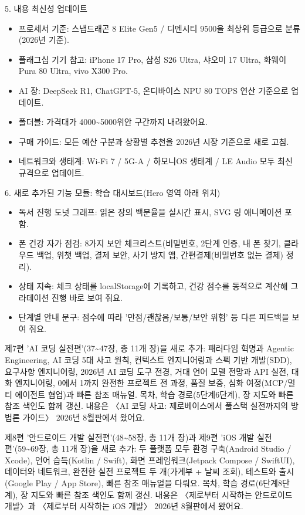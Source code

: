 5. 내용 최신성 업데이트

\begin{itemize}
  \item 프로세서 기준: 스냅드래곤 8 Elite Gen5 / 디멘시티 9500을 최상위 등급으로 분류(2026년 기준).
  \item 플래그십 기기 참고: iPhone 17 Pro, 삼성 S26 Ultra, 샤오미 17 Ultra, 화웨이 Pura 80 Ultra, vivo X300 Pro.
  \item AI 장: DeepSeek R1, ChatGPT-5, 온디바이스 NPU 80 TOPS 연산 기준으로 업데이트.
  \item 폴더블: 가격대가 4000\textasciitilde{}5000위안 구간까지 내려왔어요.
  \item 구매 가이드: 모든 예산 구분과 상황별 추천을 2026년 시장 기준으로 새로 고침.
  \item 네트워크와 생태계: Wi-Fi 7 / 5G-A / 하모니OS 생태계 / LE Audio 모두 최신 규격으로 업데이트.
\end{itemize}

6. 새로 추가된 기능 모듈: 학습 대시보드(Hero 영역 아래 위치)

\begin{itemize}
  \item 독서 진행 도넛 그래프: 읽은 장의 백분율을 실시간 표시, SVG 링 애니메이션 포함.
  \item 폰 건강 자가 점검: 8가지 보안 체크리스트(비밀번호, 2단계 인증, 내 폰 찾기, 클라우드 백업, 위챗 백업, 결제 보안, 사기 방지 앱, 간편결제(비밀번호 없는 결제) 정리).
  \item 상태 지속: 체크 상태를 localStorage에 기록하고, 건강 점수를 동적으로 계산해 그라데이션 진행 바로 보여 줘요.
  \item 단계별 안내 문구: 점수에 따라 '만점/괜찮음/보통/보안 위험' 등 다른 피드백을 보여 줘요.
\end{itemize}


제7편 'AI 코딩 실전편'(37\textasciitilde{}47장, 총 11개 장)을 새로 추가: 패러다임 혁명과 Agentic Engineering, AI 코딩 5대 사고 원칙, 컨텍스트 엔지니어링과 스펙 기반 개발(SDD), 요구사항 엔지니어링, 2026년 AI 코딩 도구 전경, 거대 언어 모델 전망과 API 실전, 대화 엔지니어링, 0에서 1까지 완전한 프로젝트 전 과정, 품질 보증, 심화 여정(MCP/멀티 에이전트 협업)과 빠른 참조 매뉴얼. 목차, 학습 경로(5단계6단계), 장 지도와 빠른 참조 색인도 함께 갱신. 내용은 〈AI 코딩 사고: 제로베이스에서 풀스택 실전까지의 방법론 가이드〉 2026년 8월판에서 왔어요.

제8편 '안드로이드 개발 실전편'(48\textasciitilde{}58장, 총 11개 장)과 제9편 'iOS 개발 실전편'(59\textasciitilde{}69장, 총 11개 장)을 새로 추가: 두 플랫폼 모두 환경 구축(Android Studio / Xcode), 언어 습득(Kotlin / Swift), 화면 프레임워크(Jetpack Compose / SwiftUI), 데이터와 네트워크, 완전한 실전 프로젝트 두 개(가계부 + 날씨 조회), 테스트와 출시(Google Play / App Store), 빠른 참조 매뉴얼을 다뤄요. 목차, 학습 경로(6단계8단계), 장 지도와 빠른 참조 색인도 함께 갱신. 내용은 〈제로부터 시작하는 안드로이드 개발〉과 〈제로부터 시작하는 iOS 개발〉 2026년 8월판에서 왔어요.

